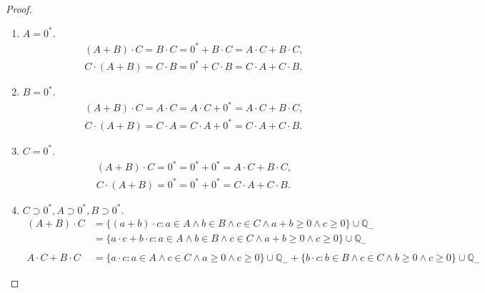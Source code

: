 \begin{proof}
\begin{enumerate}[label={(F\arabic*)}, start=5]
              \begin{enumerate}[label={\textbf{Case \arabic*.}}]
                  \item $A = {0}^{*}$.
                        \[
                            \begin{split}
                                (A + B)\cdot C = B\cdot C = {0}^{*} + B\cdot C = A\cdot C + B\cdot C, \\
                                C\cdot (A + B) = C\cdot B = {0}^{*} + C\cdot B = C\cdot A + C\cdot B.
                            \end{split}
                        \]
                  \item $B = {0}^{*}$.
                        \[
                            \begin{split}
                                (A + B)\cdot C = A\cdot C = A\cdot C + {0}^{*} = A\cdot C + B\cdot C, \\
                                C\cdot (A + B) = C\cdot A = C\cdot A + {0}^{*} = C\cdot A + C\cdot B.
                            \end{split}
                        \]
                  \item $C = {0}^{*}$.
                        \[
                            \begin{split}
                                (A + B)\cdot C = {0}^{*} = {0}^{*} + {0}^{*} = A\cdot C + B\cdot C, \\
                                C\cdot (A + B) = {0}^{*} = {0}^{*} + {0}^{*} = C\cdot A + C\cdot B.
                            \end{split}
                        \]
                  \item $C\supset {0}^{*}, A\supset {0}^{*}, B\supset {0}^{*}$.
                        \begin{align*}
                            (A + B)\cdot C      & = \{ (a + b)\cdot c : a\in A\land b\in B\land c\in C\land a+b\ge 0\land c\ge 0 \} \cup\mathbb{Q}_{-}                                                              \\
                                                & = \{ a\cdot c + b\cdot c : a\in A\land b\in B\land c\in C\land a+b\ge 0\land c\ge 0 \} \cup\mathbb{Q}_{-}                                                         \\
                            \\
                            A\cdot C + B\cdot C & = \{ a\cdot c : a\in A\land c\in C\land a\ge 0\land c\ge 0 \} \cup\mathbb{Q}_{-} + \{ b\cdot c : b\in B\land c\in C\land b\ge 0\land c\ge 0 \} \cup\mathbb{Q}_{-}
                        \end{align*}
              \end{enumerate}


\end{enumerate}
\end{proof}
